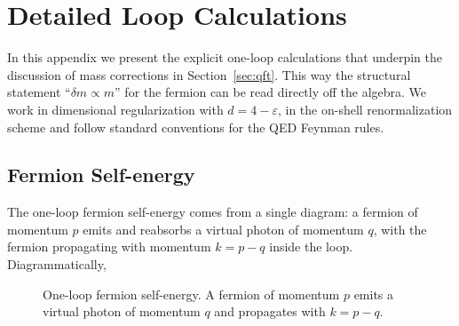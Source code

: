 \documentclass[a4paper, 11pt]{article}
\begin{document}
\section{Detailed Loop Calculations}
\label{app:loop_calcs}

In this appendix we present the explicit one-loop calculations that underpin the discussion of mass corrections in Section~\ref{sec:qft}. This way the structural statement ``$\delta m \propto m$'' for the fermion can be read directly off the algebra. We work in dimensional regularization with $d = 4 - \varepsilon$, in the on-shell renormalization scheme and follow standard conventions for the QED Feynman rules.

\subsection{Fermion Self-energy}
\label{app:fermion_selfenergy}

The one-loop fermion self-energy comes from a single diagram: a fermion of momentum $p$ emits and reabsorbs a virtual photon of momentum $q$, with the fermion propagating with momentum $k = p - q$ inside the loop. Diagrammatically,

\begin{figure}[H]
    \centering
    \caption{One-loop fermion self-energy. A fermion of momentum $p$ emits a virtual photon of momentum $q$ and propagates with $k = p - q$.}
    \label{fig:fermion_selfenergy}
\end{figure}
\end{document}
